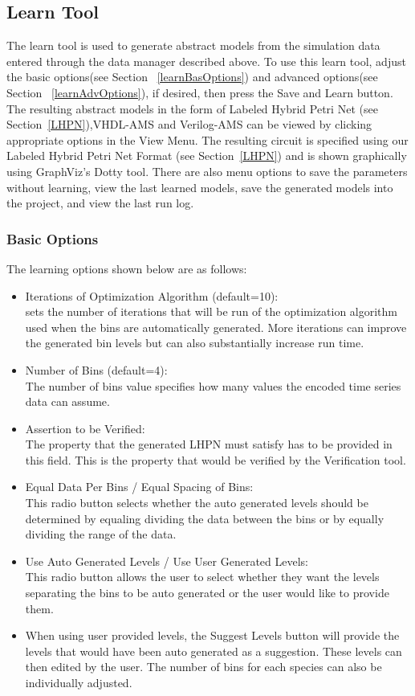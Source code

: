 \documentclass[titlepage,11pt]{article}
\begin{document}
\clearpage

\subsection{\label{learnTool}Learn Tool}

\noindent
The learn tool is used to generate abstract models from the 
simulation data entered through the data manager described above. To 
use this learn tool, adjust the basic options(see Section 
~\ref{learnBasOptions}) and advanced options(see Section 
~\ref{learnAdvOptions}), if desired, then press the Save and Learn button. 
The resulting abstract models in the form of Labeled Hybrid Petri Net
 (see Section~\ref{LHPN}),VHDL-AMS and Verilog-AMS can be viewed by 
clicking appropriate options in the View Menu. The resulting circuit is 
specified using our Labeled Hybrid Petri Net Format (see Section~\ref{LHPN})
 and is shown graphically using GraphViz's Dotty tool.  There are also 
menu options to save the parameters without learning, view the last learned 
models, save the generated models into the project, and view the last run
log. 

\subsubsection{\label{learnBasOptions}Basic Options}

The learning options shown below are as follows:
\begin{itemize}
\item Iterations of Optimization Algorithm (default=10): \\
sets the number of iterations that will be run of the optimization algorithm 
used when the bins are automatically generated.  More iterations can improve 
the generated bin levels but can also substantially increase run time.
\item Number of Bins (default=4): \\
The number of bins value specifies how many values the
encoded time series data can assume.
\item Assertion to be Verified: \\
The property that the generated LHPN must satisfy has to be provided
in this field. This is the property that would be verified by the
Verification tool.
\item Equal Data Per Bins / Equal Spacing of Bins: \\
This radio button selects whether the auto generated levels
should be determined by equaling dividing the data between the
bins or by equally dividing the range of the data. 
\item Use Auto Generated Levels / Use User Generated Levels: \\
This radio button allows the user to select whether they want
the levels separating the bins to be auto generated or the user
would like to provide them. 
\item When using user provided levels, the Suggest Levels
button will provide the levels that would have been auto
generated as a suggestion. These levels can then edited by the
user.  The number of bins for each species can also be individually adjusted.  
\end{itemize}
\end{document}
